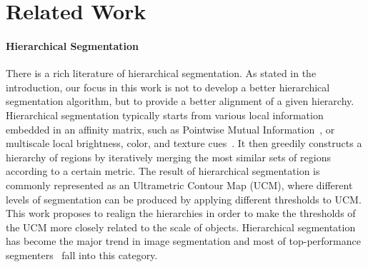 



\section{Related Work}
\label{scale:sec:related}
\paragraph{Hierarchical Segmentation}
There is a rich literature of hierarchical segmentation.
As stated in the introduction, our focus in this work is not to develop a better hierarchical
segmentation algorithm, but to provide a better alignment of a given hierarchy. 
Hierarchical segmentation typically starts from various local information embedded in an affinity matrix,
such as Pointwise Mutual Information~\citep{isola2014crisp}, or multiscale local brightness, color, and texture cues~\citep{arbelaez2011contour}.
It then greedily constructs a hierarchy of regions by iteratively merging the most similar sets of regions
according to a certain metric. 
The result of hierarchical segmentation is commonly represented as an Ultrametric Contour Map (UCM),
where different levels of segmentation can be produced by applying different thresholds to UCM.
This work proposes to realign the hierarchies in order to make the thresholds of the UCM more closely related
to the scale of objects.
Hierarchical segmentation has become the major trend in image segmentation and most of top-performance segmenters~\citep{arbelaez2011contour,MCG,Ren2013,kim2013learning} fall into this category. 

